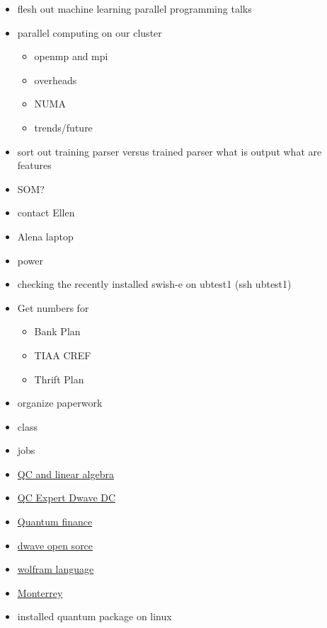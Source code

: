 \documentclass[hyperref]{labbook}
\begin{document}

\begin{itemize}
\item flesh out machine learning parallel programming talks
\item parallel computing on our cluster
  \begin{itemize}
  \item openmp and mpi
  \item overheads
  \item NUMA
  \item trends/future
  \end{itemize}
\end{itemize}

\begin{itemize}
\item sort out training parser versus trained parser  what is output  what are features
\item SOM?
\item contact Ellen
\end{itemize}

\begin{itemize}
\item Alena laptop
\item power 
\item checking the recently installed swish-e on ubtest1   (ssh ubtest1)  
\end{itemize}

\begin{itemize}
\item Get numbers for 
  \begin{itemize}
  \item Bank Plan
  \item TIAA CREF
  \item Thrift Plan
  \end{itemize}
\item organize paperwork
\end{itemize}

\begin{itemize}
\item class
\item jobs
\item \href{https://www.reddit.com/r/askscience/comments/2egd6r/what_are_the_implications_for_quantum_computing/}{QC and linear algebra}
\item \href{https://www.dwavesys.com/careers/site-quantum-computing-expert}{QC Expert Dwave  DC}
\item \href{https://en.wikipedia.org/wiki/Quantum_finance}{Quantum finance}
\item \href{https://www.wired.com/2017/01/d-wave-turns-open-source-democratize-quantum-computing/}{dwave open sorce}
\item \href{http://community.wolfram.com/groups/-/m/t/897811}{wolfram language}
\item \href{http://homepage.cem.itesm.mx/jose.luis.gomez/quantum/}{Monterrey}
\item installed quantum package on  linux
\end{itemize}
\end{document}

